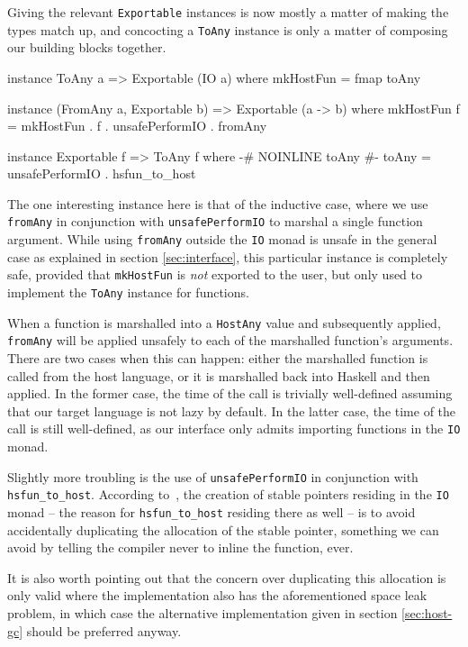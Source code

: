 \documentclass{sigplanconf}
\begin{document}
Giving the relevant \lstinline!Exportable! instances is now mostly a matter of
making the types match up, and concocting a \lstinline!ToAny! instance is only
a matter of composing our building blocks together.

\begin{code}
instance ToAny a => Exportable (IO a) where
  mkHostFun = fmap toAny

instance (FromAny a, Exportable b) =>
          Exportable (a -> b) where
  mkHostFun f =
    mkHostFun . f . unsafePerformIO . fromAny
  
instance Exportable f => ToAny f where
  {-# NOINLINE toAny #-}
  toAny = unsafePerformIO . hsfun_to_host
\end{code}

The one interesting instance here is that of the inductive case, where we use
\lstinline!fromAny! in conjunction with \lstinline!unsafePerformIO! to marshal
a single function argument. While using \lstinline!fromAny! outside the
\lstinline!IO! monad is unsafe in the general case as explained in section
\ref{sec:interface}, this particular instance is completely safe, provided that
\lstinline!mkHostFun! is \emph{not} exported to the user, but only used to
implement the \lstinline!ToAny! instance for functions.

When a function is marshalled into a \lstinline!HostAny! value and subsequently
applied, \lstinline!fromAny! will be applied unsafely to each of the
marshalled function's arguments. There are two cases
when this can happen: either the marshalled function is called from the host
language, or it is marshalled back into Haskell and then applied.
In the former case, the time of the call is trivially well-defined assuming
that our target language is not lazy by default.
In the latter case, the time of the call is still well-defined, as our
interface only admits importing functions in the \lstinline!IO! monad.

Slightly more troubling is the use of \lstinline!unsafePerformIO! in
conjunction with \lstinline!hsfun_to_host!.
According to\ \cite{stableptr}, the creation of stable pointers residing in
the \lstinline!IO! monad -- the reason for \lstinline!hsfun_to_host! residing
there as well -- is to avoid accidentally duplicating the allocation of the
stable pointer, something we can avoid by telling the compiler never to
inline the function, ever.

It is also worth pointing out that the concern over duplicating this allocation
is only valid where the implementation also has the aforementioned space leak
problem, in which case the alternative implementation given in section
\ref{sec:host-gc} should be preferred anyway.
\end{document}
